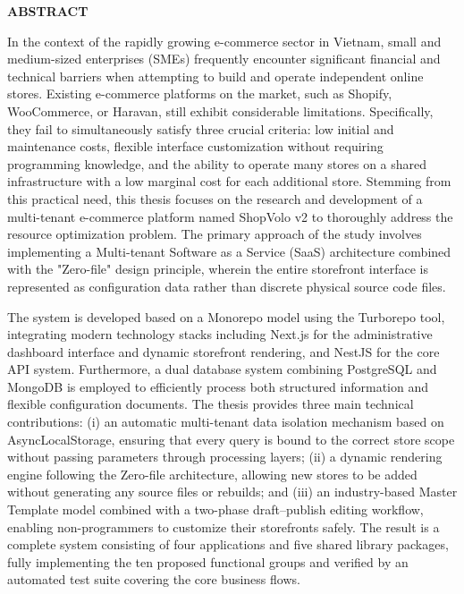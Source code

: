 \documentclass[../main.tex]{subfiles}
\begin{document}
\begin{center}
    \Large{\textbf{ABSTRACT}}\\
\end{center}
\vspace{1cm}
In the context of the rapidly growing e-commerce sector in Vietnam, small and medium-sized enterprises (SMEs) frequently encounter significant financial and technical barriers when attempting to build and operate independent online stores. Existing e-commerce platforms on the market, such as Shopify, WooCommerce, or Haravan, still exhibit considerable limitations. Specifically, they fail to simultaneously satisfy three crucial criteria: low initial and maintenance costs, flexible interface customization without requiring programming knowledge, and the ability to operate many stores on a shared infrastructure with a low marginal cost for each additional store. Stemming from this practical need, this thesis focuses on the research and development of a multi-tenant e-commerce platform named ShopVolo v2 to thoroughly address the resource optimization problem. The primary approach of the study involves implementing a Multi-tenant Software as a Service (SaaS) architecture combined with the "Zero-file" design principle, wherein the entire storefront interface is represented as configuration data rather than discrete physical source code files.

The system is developed based on a Monorepo model using the Turborepo tool, integrating modern technology stacks including Next.js for the administrative dashboard interface and dynamic storefront rendering, and NestJS for the core API system. Furthermore, a dual database system combining PostgreSQL and MongoDB is employed to efficiently process both structured information and flexible configuration documents. The thesis provides three main technical contributions: (i) an automatic multi-tenant data isolation mechanism based on AsyncLocalStorage, ensuring that every query is bound to the correct store scope without passing parameters through processing layers; (ii) a dynamic rendering engine following the Zero-file architecture, allowing new stores to be added without generating any source files or rebuilds; and (iii) an industry-based Master Template model combined with a two-phase draft--publish editing workflow, enabling non-programmers to customize their storefronts safely. The result is a complete system consisting of four applications and five shared library packages, fully implementing the ten proposed functional groups and verified by an automated test suite covering the core business flows.
\end{document}
